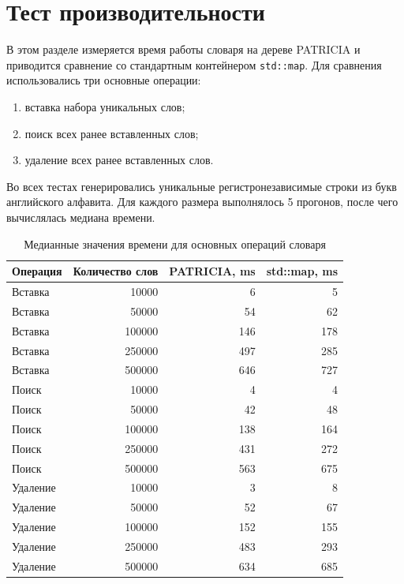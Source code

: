 \section{Тест производительности}

В этом разделе измеряется время работы словаря на дереве PATRICIA и приводится сравнение со стандартным контейнером \texttt{std::map}. Для сравнения использовались три основные операции:
\begin{enumerate}
    \item вставка набора уникальных слов;
    \item поиск всех ранее вставленных слов;
    \item удаление всех ранее вставленных слов.
\end{enumerate}

Во всех тестах генерировались уникальные регистронезависимые строки из букв английского алфавита. Для каждого размера выполнялось 5 прогонов, после чего вычислялась медиана времени.

\begin{table}[h!]
    \centering
    \small
    \begin{tabular}{|l|r|r|r|}
        \hline
        \textbf{Операция} & \textbf{Количество слов} & \textbf{PATRICIA, ms} & \textbf{std::map, ms} \\
        \hline
        Вставка  & 10000  & 6   & 5   \\
        Вставка  & 50000  & 54  & 62  \\
        Вставка  & 100000 & 146 & 178 \\
        Вставка  & 250000 & 497 & 285 \\
        Вставка  & 500000 & 646 & 727 \\
        \hline
        Поиск    & 10000  & 4   & 4   \\
        Поиск    & 50000  & 42  & 48  \\
        Поиск    & 100000 & 138 & 164 \\
        Поиск    & 250000 & 431 & 272 \\
        Поиск    & 500000 & 563 & 675 \\
        \hline
        Удаление & 10000  & 3   & 8   \\
        Удаление & 50000  & 52  & 67  \\
        Удаление & 100000 & 152 & 155 \\
        Удаление & 250000 & 483 & 293 \\
        Удаление & 500000 & 634 & 685 \\
        \hline
    \end{tabular}
    \caption{Медианные значения времени для основных операций словаря}
\end{table}

